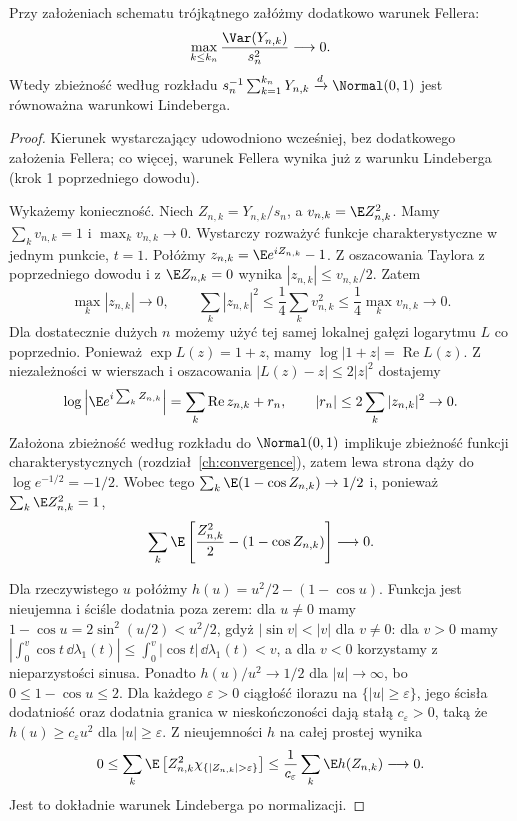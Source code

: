 \begin{twierdzenie}
\label{thm:rp1-11-lindeberg-feller}
Przy założeniach schematu trójkątnego załóżmy dodatkowo
warunek Fellera:
\[
\max_{k\leq k_n}\frac{\Var(Y_{n,k})}{s_n^2}
\longrightarrow0.
\]
Wtedy zbieżność według rozkładu
$s_n^{-1}\sum_{k=1}^{k_n}Y_{n,k}\xrightarrow{d}\Normal(0,1)$
jest równoważna warunkowi Lindeberga.
\end{twierdzenie}
\begin{proof}
Kierunek wystarczający udowodniono wcześniej, bez
dodatkowego założenia Fellera; co więcej, warunek
Fellera wynika już z warunku Lindeberga (krok 1
poprzedniego dowodu).

Wykażemy konieczność. Niech $Z_{n,k}=Y_{n,k}/s_n$,
a $v_{n,k}=\E Z_{n,k}^2$. Mamy $\sum_k v_{n,k}=1$
i $\max_k v_{n,k}\to0$.
Wystarczy rozważyć funkcje charakterystyczne w jednym
punkcie, $t=1$. Połóżmy $z_{n,k}=\E e^{iZ_{n,k}}-1$. Z oszacowania Taylora
z poprzedniego dowodu i z $\E Z_{n,k}=0$ wynika
$|z_{n,k}|\leq v_{n,k}/2$. Zatem
\[
\max_k|z_{n,k}|\to0,\qquad
\sum_k |z_{n,k}|^2\leq
\frac14\sum_k v_{n,k}^2
\leq\frac14\max_k v_{n,k}\to0.
\]
Dla dostatecznie dużych $n$ możemy użyć tej samej
lokalnej gałęzi logarytmu $L$ co poprzednio.
Ponieważ $\exp L(z)=1+z$, mamy
$\log|1+z|=\operatorname{Re} L(z)$.
Z niezależności w wierszach i oszacowania
$|L(z)-z|\leq2|z|^2$ dostajemy
\[
\log\left|\E e^{i\sum_k Z_{n,k}}\right|
=\sum_k\operatorname{Re} z_{n,k}+r_n,
\qquad |r_n|\leq 2\sum_k|z_{n,k}|^2\to0.
\]
Założona zbieżność według rozkładu do $\Normal(0,1)$
implikuje zbieżność funkcji charakterystycznych
(rozdział~\ref{ch:convergence}), zatem lewa strona
dąży do $\log e^{-1/2}=-1/2$. Wobec tego
$\sum_k\E(1-\cos Z_{n,k})\to1/2$ i, ponieważ
$\sum_k\E Z_{n,k}^2=1$,
\[
\sum_k\E\left[\frac{Z_{n,k}^2}{2}
 -(1-\cos Z_{n,k})\right]\longrightarrow0.
\]

Dla rzeczywistego $u$ połóżmy
$h(u)=u^2/2-(1-\cos u)$. Funkcja jest nieujemna
i ściśle dodatnia poza zerem: dla $u\ne0$
mamy $1-\cos u=2\sin^2(u/2)<u^2/2$,
gdyż $|\sin v|<|v|$ dla $v\ne0$: dla $v>0$
mamy $|\int_0^v\cos t\,\dd\lambda_1(t)|
\leq\int_0^v|\cos t|\,\dd\lambda_1(t)<v$,
a dla $v<0$ korzystamy z nieparzystości sinusa.
Ponadto $h(u)/u^2\to1/2$ dla $|u|\to\infty$,
bo $0\leq1-\cos u\leq2$.
Dla każdego $\varepsilon>0$ ciągłość ilorazu
na $\{|u|\geq\varepsilon\}$, jego ścisła dodatniość
oraz dodatnia granica w nieskończoności dają
stałą $c_\varepsilon>0$, taką że
$h(u)\geq c_\varepsilon u^2$ dla $|u|\geq\varepsilon$.
Z nieujemności $h$ na całej prostej wynika
\[
0\leq\sum_k\E\left[
 Z_{n,k}^2\chi_{\{|Z_{n,k}|>\varepsilon\}}\right]
\leq \frac1{c_\varepsilon}\sum_k\E h(Z_{n,k})
\longrightarrow0.
\]
Jest to dokładnie warunek Lindeberga po normalizacji.
\end{proof}

